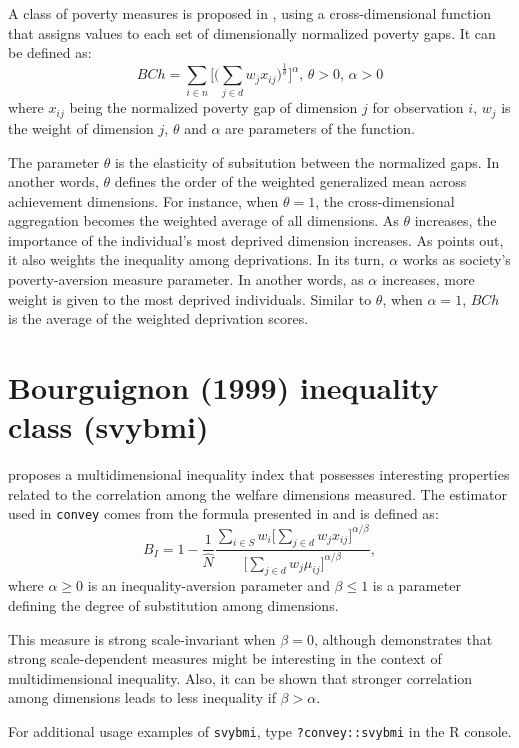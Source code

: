 \documentclass[]{book}
\begin{document}
A class of poverty measures is proposed in \citet{bourguignon2003}, using a cross-dimensional function that assigns values to each set of dimensionally normalized poverty gaps. It can be defined as:
\[
BCh = \sum_{i \in n} \bigg[ \bigg( \sum_{j \in d} w_{j} x_{ij} \bigg)^{\frac{1}{\theta}} \bigg]^\alpha \text{, } \theta > 0 \text{, } \alpha > 0
\]
where \(x_{ij}\) being the normalized poverty gap of dimension \(j\) for observation \(i\), \(w_j\) is the weight of dimension \(j\), \(\theta\) and \(\alpha\) are parameters of the function.

The parameter \(\theta\) is the elasticity of subsitution between the normalized gaps. In another words, \(\theta\) defines the order of the weighted generalized mean across achievement dimensions. For instance, when \(\theta = 1\), the cross-dimensional aggregation becomes the weighted average of all dimensions. As \(\theta\) increases, the importance of the individual's most deprived dimension increases. As \citet{vega2009} points out, it also weights the inequality among deprivations. In its turn, \(\alpha\) works as society's poverty-aversion measure parameter. In another words, as \(\alpha\) increases, more weight is given to the most deprived individuals. Similar to \(\theta\), when \(\alpha = 1\), \(BCh\) is the average of the weighted deprivation scores.

\hypertarget{bourguignon-1999-inequality-class-svybmi}{%
\section{Bourguignon (1999) inequality class (svybmi)}\label{bourguignon-1999-inequality-class-svybmi}}

\citet{bourguignon1999} proposes a multidimensional inequality index that possesses interesting properties related to the correlation among the welfare dimensions measured. The estimator used in \texttt{convey} comes from the formula presented in \citet{lugo2007} and is defined as:
\[
B_{I} = 1 - \frac{1}{ \widehat{N} } \frac{ \sum_{ i \in S } w_i \bigg[ \sum_{ j \in d } w_j x_{ij} \bigg]^{ \alpha / \beta } }{ 
\bigg[ \sum_{ j \in d } w_j \mu_{ij} \bigg]^{ \alpha / \beta } },
\]
where \(\alpha \geqslant 0\) is an inequality-aversion parameter and \(\beta \leqslant 1\) is a parameter defining the degree of substitution among dimensions.

This measure is strong scale-invariant when \(\beta = 0\), although \citet{bourguignon1999} demonstrates that strong scale-dependent measures might be interesting in the context of multidimensional inequality. Also, it can be shown that stronger correlation among dimensions leads to less inequality if \(\beta > \alpha\).

For additional usage examples of \texttt{svybmi}, type \texttt{?convey::svybmi} in the R console.


\end{document}
